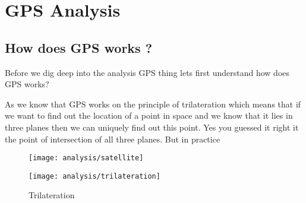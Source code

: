 \section{GPS Analysis}
\subsection{How does GPS works ?}
Before we dig deep into the analysis GPS thing lets first understand how does GPS works?

As we know that GPS works on the principle of trilateration which means that if we
want to find out the location of a point in space and we know that it lies in three
planes then we can uniquely find out this point. Yes you guessed it right it the
point of intersection of all three planes. But in practice 

\begin{figure}
  \centering
  \begin{minipage}{.5\textwidth}
    \centering
    \texttt{[image: analysis/satellite]}
    
  \end{minipage}%
\end{figure}
\begin{figure}[h]
  \centering
  \texttt{[image: analysis/trilateration]}
  \caption{Trilateration}
\end{figure}
